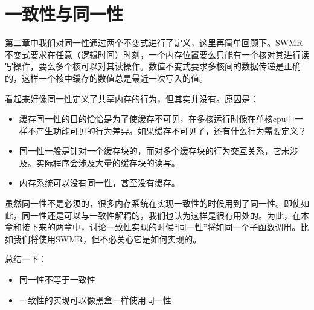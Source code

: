 \documentclass[UTF-8]{ctexrep}
\begin{document}
\section{一致性与同一性}
第二章中我们对同一性通过两个不变式进行了定义，这里再简单回顾下。SWMR 不变式要求在任意（逻辑时间）时刻，一个内存位置要么只能有一个核对其进行读写操作，要么多个核可以对其读操作。数值不变式要求多核间的数据传递是正确的，这样一个核中缓存的数值总是最近一次写入的值。
\par 看起来好像同一性定义了共享内存的行为，但其实并没有。原因是：
\begin{itemize}
\item 缓存同一性的目的恰恰是为了使缓存不可见，在多核运行时像在单核cpu中一样不产生功能可见的行为差异。如果缓存不可见了，还有什么行为需要定义？
\item 同一性一般是针对一个缓存块的，而对多个缓存块的行为交互关系，它未涉及。实际程序会涉及大量的缓存块的读写。
\item 内存系统可以没有同一性，甚至没有缓存。
\end{itemize}
\par 虽然同一性不是必须的，很多内存系统在实现一致性的时候用到了同一性。即使如此，同一性还是可以与一致性解耦的，我们也认为这样是很有用处的。为此，在本章和接下来的两章中，讨论一致性实现的时候“同一性”将如同一个子函数调用。比如我们将使用SWMR，但不必关心它是如何实现的。
\par 总结一下：
\begin{itemize}
\item 同一性不等于一致性
\item 一致性的实现可以像黑盒一样使用同一性
\end{itemize}
\end{document}
